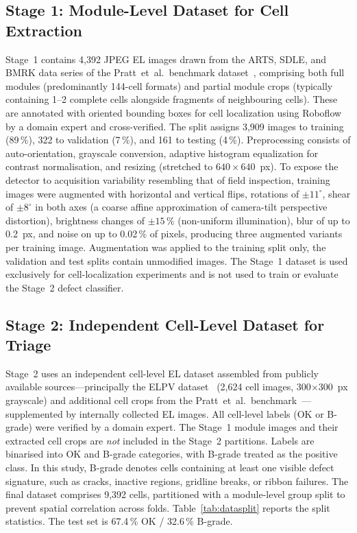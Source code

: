 \documentclass[conference]{IEEEtran}
\begin{document}
\subsection{Stage 1: Module-Level Dataset for Cell Extraction}
Stage~1 contains 4{,}392 JPEG EL images drawn from the ARTS, SDLE, and BMRK data series of the Pratt~et~al.\ benchmark dataset~\cite{pratt2023benchmark}, comprising both full modules (predominantly 144-cell formats) and partial module crops (typically containing 1--2 complete cells alongside fragments of neighbouring cells). These are annotated with oriented bounding boxes for cell localization using Roboflow by a domain expert and cross-verified. The split assigns 3{,}909 images to training (89\,\%), 322 to validation (7\,\%), and 161 to testing (4\,\%). Preprocessing consists of auto-orientation, grayscale conversion, adaptive histogram equalization for contrast normalisation, and resizing (stretched to $640\times640$~px). To expose the detector to acquisition variability resembling that of field inspection, training images were augmented with horizontal and vertical flips, rotations of $\pm11^\circ$, shear of $\pm8^\circ$ in both axes (a coarse affine approximation of camera-tilt perspective distortion), brightness changes of $\pm15\,\%$ (non-uniform illumination), blur of up to 0.2~px, and noise on up to 0.02\,\% of pixels, producing three augmented variants per training image. Augmentation was applied to the training split only, the validation and test splits contain unmodified images. The Stage~1 dataset is used exclusively for cell-localization experiments and is not used to train or evaluate the Stage~2 defect classifier.

\subsection{Stage 2: Independent Cell-Level Dataset for Triage}
Stage~2 uses an independent cell-level EL dataset assembled from publicly available sources---principally the ELPV dataset~\cite{deitsch2019} (2{,}624 cell images, 300$\times$300~px grayscale) and additional cell crops from the Pratt~et~al.\ benchmark~\cite{pratt2023benchmark}---supplemented by internally collected EL images. All cell-level labels (OK or B-grade) were verified by a domain expert. The Stage~1 module images and their extracted cell crops are \textit{not} included in the Stage~2 partitions. Labels are binarised into OK and B-grade categories, with B-grade treated as the positive class. In this study, B-grade denotes cells containing at least one visible defect signature, such as cracks, inactive regions, gridline breaks, or ribbon failures. The final dataset comprises 9{,}392 cells, partitioned with a module-level group split to prevent spatial correlation across folds. Table~\ref{tab:datasplit} reports the split statistics. The test set is 67.4\,\% OK / 32.6\,\% B-grade.
\end{document}
